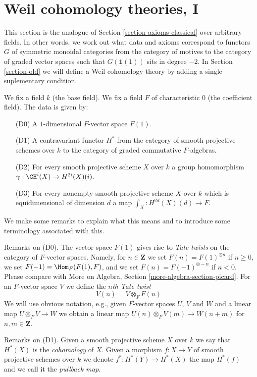 \section{Weil cohomology theories, I}
\label{section-axioms}

\noindent
This section is the analogue of Section \ref{section-axioms-classical}
over arbitrary fields. In other words, we work out what data and
axioms correspond to functors $G$ of symmetric monoidal categories from
the category of motives to the category of graded vector spaces such that
$G(\mathbf{1}(1))$ sits in degree $-2$. In Section \ref{section-old}
we will define a Weil cohomology theory by adding a single suplementary
condition.

\medskip\noindent
We fix a field $k$ (the base field).
We fix a field $F$ of characteristic $0$ (the coefficient field).
The data is given by:
\begin{enumerate}
\item[(D0)] A $1$-dimensional $F$-vector space $F(1)$.
\item[(D1)] A contravariant functor $H^*$ from the category
of smooth projective schemes over $k$ to the category of
graded commutative $F$-algebras.
\item[(D2)] For every smooth projective scheme $X$ over $k$
a group homomorphism $\gamma : \CH^i(X) \to H^{2i}(X)(i)$.
\item[(D3)] For every nonempty smooth projective scheme $X$ over $k$
which is equidimensional of dimension $d$ a map
$\int_X : H^{2d}(X)(d) \to F$.
\end{enumerate}
We make some remarks to explain what this means and to introduce
some terminology associated with this.

\medskip\noindent
Remarks on (D0).
The vector space $F(1)$ gives rise to {\it Tate twists} on the category of
$F$-vector spaces. Namely, for $n \in \mathbf{Z}$ we set
$F(n) = F(1)^{\otimes n}$ if $n \geq 0$, we set $F(-1) = \Hom_F(F(1), F)$,
and we set $F(n) = F(-1)^{\otimes - n}$ if $n < 0$. Please compare
with More on Algebra, Section \ref{more-algebra-section-picard}.
For an $F$-vector space $V$ we define the {\it $n$th Tate twist}
$$
V(n) = V \otimes_F F(n)
$$
We will use obvious notation, e.g., given $F$-vector spaces $U$, $V$
and $W$ and a linear map $U \otimes_F V \to W$ we obtain a linear
map $U(n) \otimes_F V(m) \to W(n + m)$ for $n, m \in \mathbf{Z}$.

\medskip\noindent
Remarks on (D1).
Given a smooth projective scheme $X$ over $k$ we say that $H^*(X)$
is the {\it cohomology} of $X$. Given a morphism $f : X \to Y$
of smooth projective schemes over $k$ we denote $f^* : H^*(Y) \to H^*(X)$
the map $H^*(f)$ and we call it the {\it pullback map}.

